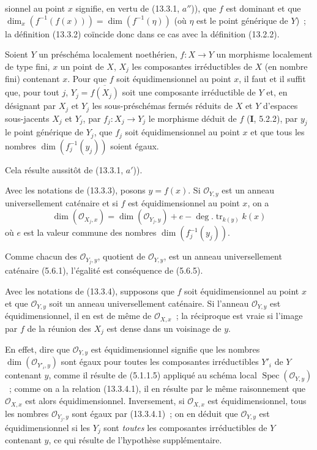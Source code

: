 sionnel au point $x$ signifie, en vertu de (13.3.1, $a''$)), que $f$ est
dominant et que
$\dim_x(f^{-1}(f(x)))=\dim(f^{-1}(\eta))$ (où $\eta$ est le point générique de
$Y$)~; la définition (13.3.2) coïncide donc dans ce cas avec la définition
(13.2.2).

\begin{proposition}[13.3.3]
\label{IV.13.3.3-fr}
Soient $Y$ un préschéma localement noethérien, $f:X\to Y$ un morphisme
localement de type fini, $x$ un point de $X$, $X_j$ les composantes
irréductibles de $X$ (en nombre fini) contenant $x$. Pour que $f$ soit
équidimensionnel au point $x$, il faut et il suffit que, pour tout $j$,
$Y_j=\overline{f(X_j)}$ soit une composante irréductible de $Y$ et, en
désignant par $X_j$ et $Y_j$ les sous-préschémas fermés réduits de $X$ et $Y$
d'espaces sous-jacents $X_j$ et $Y_j$, par $f_j:X_j\to Y_j$ le morphisme
déduit de $f$ (\textbf{I}, 5.2.2), par $y_j$ le point générique de $Y_j$, que
$f_j$ soit équidimensionnel au point $x$ et que tous les nombres
$\dim(f_j^{-1}(y_j))$ soient égaux.
\end{proposition}

Cela résulte aussitôt de (13.3.1, $a'$)).

\begin{corollary}[13.3.4]
\label{IV.13.3.4-fr}
Avec les notations de (13.3.3), posons $y=f(x)$. Si $\mathcal O_{Y,y}$ est un
anneau universellement caténaire et si $f$ est équidimensionnel au point $x$,
on a
\[
\tag{13.3.4.1}
\label{IV.13.3.4.1-fr}
  \dim(\mathcal O_{X_j,x})=\dim(\mathcal O_{Y_j,y})+e
  -\deg.\operatorname{tr}_{k(y)}k(x)
\]
où $e$ est la valeur commune des nombres $\dim(f_j^{-1}(y_j))$.
\end{corollary}

Comme chacun des $\mathcal O_{Y_j,y}$, quotient de $\mathcal O_{Y,y}$, est un
anneau universellement caténaire (5.6.1), l'égalité est conséquence de (5.6.5).

\begin{corollary}[13.3.5]
\label{IV.13.3.5-fr}
Avec les notations de (13.3.4), supposons que $f$ soit équidimensionnel au
point $x$ et que $\mathcal O_{Y,y}$ soit un anneau universellement caténaire.
Si l'anneau $\mathcal O_{Y,y}$ est équidimensionnel, il en est de même de
$\mathcal O_{X,x}$~; la réciproque est vraie si l'image par $f$ de la réunion
des $X_j$ est dense dans un voisinage de $y$.
\end{corollary}

En effet, dire que $\mathcal O_{Y,y}$ est équidimensionnel signifie que les
nombres $\dim(\mathcal O_{Y'_i,y})$ sont égaux pour toutes les composantes
irréductibles $Y'_i$ de $Y$ contenant $y$, comme il résulte de (5.1.1.5)
appliqué au schéma local $\operatorname{Spec}(\mathcal O_{Y,y})$~; comme on a
la relation (13.3.4.1), il en résulte par le même raisonnement que
$\mathcal O_{X,x}$ est alors équidimensionnel. Inversement, si
$\mathcal O_{X,x}$ est équidimensionnel, tous les nombres
$\mathcal O_{Y_j,y}$ sont égaux par (13.3.4.1)~; on en déduit que
$\mathcal O_{Y,y}$ est équidimensionnel si les $Y_j$ sont \emph{toutes} les
composantes irréductibles de $Y$ contenant $y$, ce qui résulte de l'hypothèse
supplémentaire.

